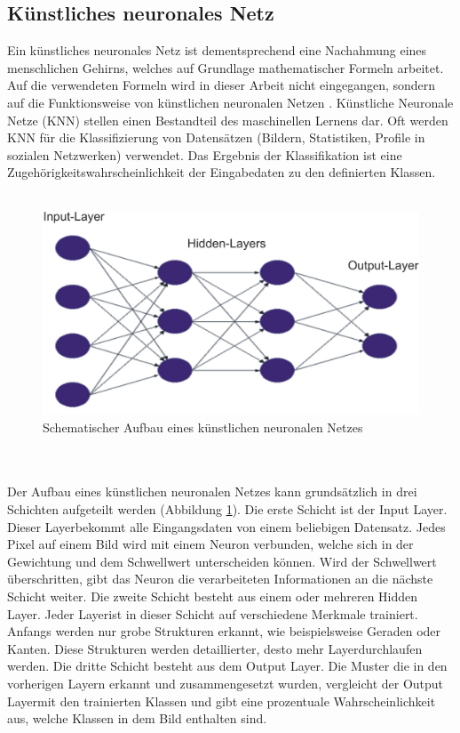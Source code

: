 \documentclass[a4paper,12pt,oneside]{article}
\begin{document}
\subsection{Künstliches neuronales Netz}
Ein künstliches neuronales Netz ist dementsprechend eine Nachahmung eines menschlichen Gehirns, welches auf Grundlage mathematischer Formeln arbeitet. Auf die verwendeten Formeln wird in dieser Arbeit nicht eingegangen, sondern auf die Funktionsweise von künstlichen neuronalen Netzen \cite[247-285]{ertel2013grundkurs}. Künstliche Neuronale Netze (KNN) stellen einen Bestandteil des maschinellen Lernens dar. Oft werden KNN für die Klassifizierung von Datensätzen (Bildern, Statistiken, Profile in sozialen Netzwerken) verwendet. Das Ergebnis der Klassifikation ist eine Zugehörigkeitswahrscheinlichkeit der Eingabedaten zu den definierten Klassen.
\\
\\
\begin{figure}
	[h]
	\centering
	\includegraphics[scale=0.5]{Sources/nnet.png}
		\caption{Schematischer Aufbau eines künstlichen neuronalen Netzes \cite{bistra2018pic} }
	\label{img:KNN}
\end{figure}
\\
\\
Der Aufbau eines künstlichen neuronalen Netzes kann grundsätzlich in drei Schichten aufgeteilt werden (Abbildung \ref{img:KNN}). Die erste Schicht ist der \glqq Input Layer\grqq. Dieser \glqq Layer\grqq bekommt alle Eingangsdaten von einem beliebigen Datensatz. Jedes Pixel auf einem Bild wird mit einem Neuron verbunden, welche sich in der Gewichtung und dem Schwellwert unterscheiden können. Wird der Schwellwert überschritten, gibt das Neuron die verarbeiteten Informationen an die nächste Schicht weiter. Die zweite Schicht besteht aus einem oder mehreren \glqq Hidden Layer\grqq. Jeder \glqq Layer\grqq ist in dieser Schicht auf verschiedene Merkmale trainiert. Anfangs werden nur grobe Strukturen erkannt, wie beispielsweise Geraden oder Kanten. Diese Strukturen werden detaillierter, desto mehr \glqq Layer\grqq durchlaufen werden. Die dritte Schicht besteht aus dem \glqq Output Layer\grqq. Die Muster die in den vorherigen Layern erkannt und zusammengesetzt wurden, vergleicht der \glqq Output Layer\grqq mit den trainierten Klassen und gibt eine prozentuale Wahrscheinlichkeit aus, welche Klassen in dem Bild enthalten sind.
\end{document}
